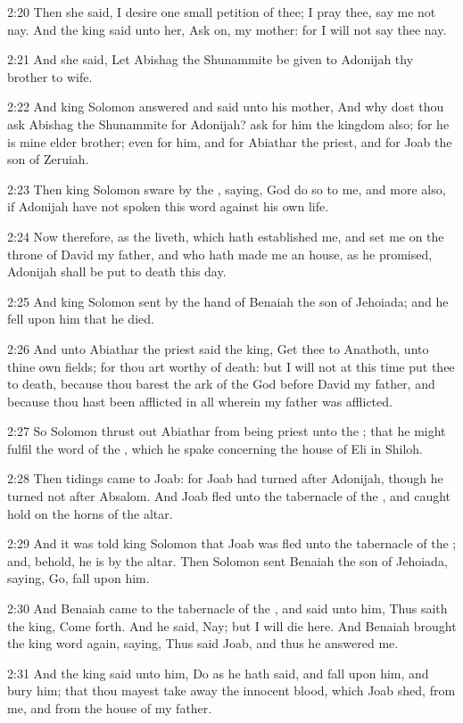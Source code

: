 2:20 Then she said, I desire one small petition of thee; I pray thee,
say me not nay. And the king said unto her, Ask on, my mother: for I
will not say thee nay.

2:21 And she said, Let Abishag the Shunammite be given to Adonijah thy
brother to wife.

2:22 And king Solomon answered and said unto his mother, And why dost
thou ask Abishag the Shunammite for Adonijah? ask for him the kingdom
also; for he is mine elder brother; even for him, and for Abiathar the
priest, and for Joab the son of Zeruiah.

2:23 Then king Solomon sware by the \LORD, saying, God do so to me, and
more also, if Adonijah have not spoken this word against his own life.

2:24 Now therefore, as the \LORD liveth, which hath established me, and
set me on the throne of David my father, and who hath made me an
house, as he promised, Adonijah shall be put to death this day.

2:25 And king Solomon sent by the hand of Benaiah the son of Jehoiada;
and he fell upon him that he died.

2:26 And unto Abiathar the priest said the king, Get thee to Anathoth,
unto thine own fields; for thou art worthy of death: but I will not at
this time put thee to death, because thou barest the ark of the \LORD
God before David my father, and because thou hast been afflicted in
all wherein my father was afflicted.

2:27 So Solomon thrust out Abiathar from being priest unto the \LORD;
that he might fulfil the word of the \LORD, which he spake concerning
the house of Eli in Shiloh.

2:28 Then tidings came to Joab: for Joab had turned after Adonijah,
though he turned not after Absalom. And Joab fled unto the tabernacle
of the \LORD, and caught hold on the horns of the altar.

2:29 And it was told king Solomon that Joab was fled unto the
tabernacle of the \LORD; and, behold, he is by the altar. Then Solomon
sent Benaiah the son of Jehoiada, saying, Go, fall upon him.

2:30 And Benaiah came to the tabernacle of the \LORD, and said unto
him, Thus saith the king, Come forth. And he said, Nay; but I will die
here. And Benaiah brought the king word again, saying, Thus said Joab,
and thus he answered me.

2:31 And the king said unto him, Do as he hath said, and fall upon
him, and bury him; that thou mayest take away the innocent blood,
which Joab shed, from me, and from the house of my father.

